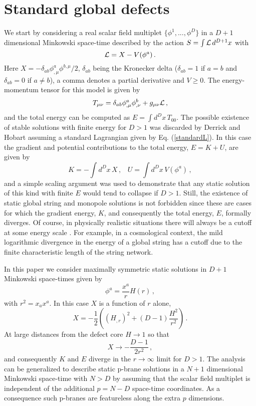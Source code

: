 \documentclass[prd,twocolumn,a4paper,superscriptaddress,floatfix]{revtex4}
\def\be{\begin{equation}}
\def\ee{\end{equation}}
\begin{document}
\section{Standard global defects}

We start by considering a real scalar field multiplet $\{\phi^1, ..., \phi^D\}$ in a $D+1$ dimensional Minkowski space-time described by the action $S=\int {\cal L} \, d^{D+1}x$ with
\be
\label{standardL}
\LL =X - V(\phi^a)\,.
\ee
Here $X=-\delta_{ab} \phi^a_{,\mu} \phi^{b,\mu}/2$, $\delta_{ab}$ being the Kronecker delta ($\delta_{ab}=1$ if $a=b$ and $\delta_{ab}=0$ if $a \neq b$), a comma denotes a partial derivative and $V \ge 0$. The energy-momentum tensor for this model is given by
\be
T_{\mu\nu}=\delta_{ab} \phi^a_{,\mu} \phi^b_{,\nu} + g_{\mu\nu}\LL\,,
\ee
and the total energy can be computed as $E=\int d^D x\, T_{00}$. The possible existence of stable solutions with finite energy for $D > 1$ was discarded by Derrick and Hobart \cite{0370-1328-82-2-306,1964JMP.....5.1252D} assuming a standard Lagrangian given by Eq. (\ref{standardL}). In this case the gradient and potential contributions to the total energy, $E=K+U$, are given by
\be\label{EGandEV}
K=-\int d^Dx  \, X\,, \, \,\,\,\, U=\int d^Dx \, V(\phi^a)\,,
\ee
and a simple scaling argument was used to demonstrate that any static solution of this kind with finite $E$ would tend to collapse if $D>1$. Still, the existence of static global string and monopole solutions is not forbidden since these are cases for which the gradient energy, $K$, and consequently the total energy, $E$,  formally diverges. Of course, in physically realistic situations there will always be a cutoff at some energy scale \cite{1992NuPhB.375..665P}. For example, in a cosmological context, the mild logarithmic divergence in the energy of a global string has a cutoff due to the finite characteristic length of the string network.

In this paper we consider maximally symmetric static solutions in $D+1$ Minkowski space-times 
given by
\be
\label{ans}
\phi^a=\frac{x^a}{r} H(r)\,,
\ee 
with $r^2=x_a x^a$. In this case $X$ is a function of $r$ alone,
\be
X=-\frac12 \left((H_{,r})^2+(D-1)\frac{H^2}{r^2}\right)\,.
\ee
At large distances from the defect core $H \to 1$ so that
\be
X \to -\frac{D-1}{2r^2}\,,
\ee
and consequently $K$ and $E$ diverge in the $r \to \infty$ limit for $D > 1$. The analysis can be generalized to describe static p-brane solutions in a $N+1$ dimensional Minkowski space-time with $N > D$ by assuming that the scalar field multiplet is independent of the additional $p=N-D$ space-time coordinates. As a consequence such p-branes are featureless along the extra $p$ dimensions.
\end{document}
